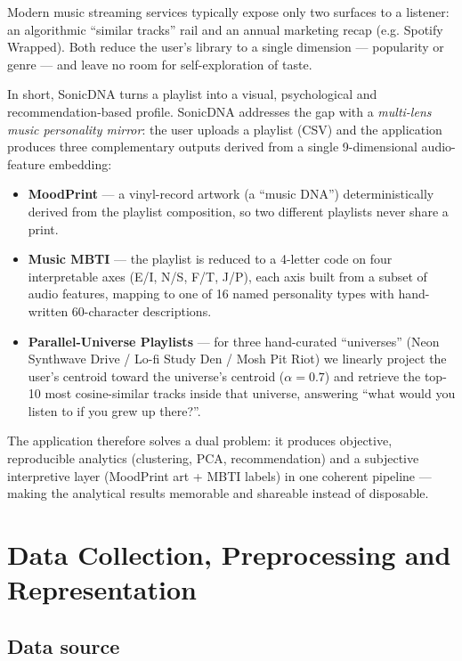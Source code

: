 \documentclass[11pt,a4paper]{article}
\begin{document}
Modern music streaming services typically expose only two surfaces to a
listener: an algorithmic ``similar tracks'' rail and an annual
marketing recap (e.g. Spotify Wrapped). Both reduce the user's library
to a single dimension --- popularity or genre --- and leave no room for
self-exploration of taste.

In short, SonicDNA turns a playlist into a visual, psychological and
recommendation-based profile. SonicDNA addresses the gap with a
\emph{multi-lens music personality mirror}: the user uploads a playlist
(CSV) and the application produces three complementary outputs derived
from a single 9-dimensional audio-feature embedding:

\begin{itemize}
  \item \textbf{MoodPrint} --- a vinyl-record artwork (a ``music DNA'')
        deterministically derived from the playlist composition, so two
        different playlists never share a print.
  \item \textbf{Music MBTI} --- the playlist is reduced to a 4-letter
        code on four interpretable axes (E/I, N/S, F/T, J/P), each axis
        built from a subset of audio features, mapping to one of 16
        named personality types with hand-written 60-character
        descriptions.
  \item \textbf{Parallel-Universe Playlists} --- for three hand-curated
        ``universes'' (Neon Synthwave Drive / Lo-fi Study Den /
        Mosh Pit Riot) we linearly project the user's centroid toward
        the universe's centroid ($\alpha = 0.7$) and retrieve the top-10
        most cosine-similar tracks inside that universe, answering
        ``what would you listen to if you grew up there?''.
\end{itemize}

The application therefore solves a dual problem: it produces objective,
reproducible analytics (clustering, PCA, recommendation) and a
subjective interpretive layer (MoodPrint art + MBTI labels) in one
coherent pipeline --- making the analytical results memorable and
shareable instead of disposable.

\section{Data Collection, Preprocessing and Representation}

\subsection{Data source}
\end{document}
